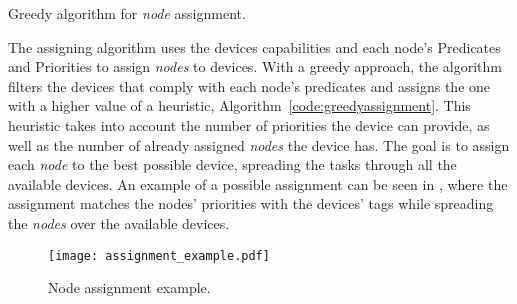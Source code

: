 \begin{algorithm}
\BlankLine
{}
\BlankLine
{}
\caption{Greedy algorithm for \textit{node} assignment.}
\label{code:greedyassignment}
\end{algorithm}

The assigning algorithm uses the devices capabilities and each node's Predicates and Priorities to assign \textit{nodes} to devices. With a greedy approach, the algorithm filters the devices that comply with each node's predicates and assigns the one with a higher value of a heuristic, \cf Algorithm~\ref{code:greedyassignment}. This heuristic takes into account the number of priorities the device can provide, as well as the number of already assigned \textit{nodes} the device has. The goal is to assign each \textit{node} to the best possible device, spreading the tasks through all the available devices. An example of a possible assignment can be seen in , where the assignment matches the nodes' priorities with the devices' tags while spreading the \textit{nodes} over the available devices.

\begin{figure}[h]
\centering
\texttt{[image: assignment\_example.pdf]}
\caption[Node assignment example.]{Node assignment example.}\label{fig:assigment_example}
\end{figure}

